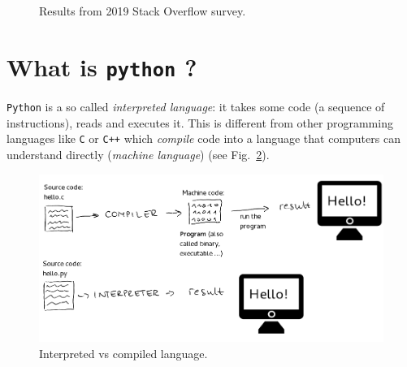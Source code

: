 \begin{figure}[!ht]
\centering
{}\\
\\
\caption{Results from 2019 Stack Overflow survey.}
\label{fig:dummy}
\end{figure}

\section{What is \texttt{python} ?}
\label{what-is-python}

\texttt{Python} is a so called \emph{interpreted language}: it takes some code (a sequence of instructions), reads and executes it. This is different from other programming languages like \texttt{C} or \texttt{C++} which \emph{compile} code into a language that computers can understand directly (\emph{machine language}) (see Fig.~\ref{fig:compiled_vs_interpreted}).

\begin{figure}[h]
\centering
\includegraphics[width=0.7\linewidth]{figures/compiled_language.png}
\caption{Interpreted vs compiled language.}
\label{fig:compiled_vs_interpreted}
\end{figure}

